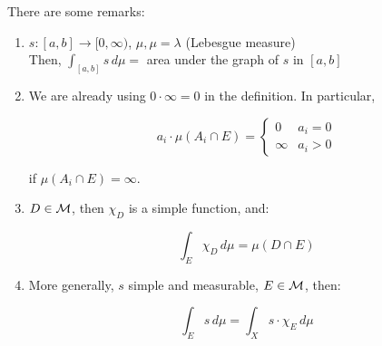 \begin{fremark}
    There are some remarks:
    \vspace{1em}

    \begin{enumerate}
        \item $s: [a,b] \to [0, \infty)$, $\mu, \mu = \lambda$ (Lebesgue measure)\\
        Then, $\int_{[a,b]} s \, d\mu =$ area under the graph of $s$ in $[a,b]$
        \vspace{1em}

        \item We are already using $0 \cdot \infty = 0$ in the definition. In particular,
        
        $$a_i \cdot \mu(A_i \cap E) = \begin{cases}
            0 & a_i = 0 \\
            \infty & a_i > 0
        \end{cases}
        $$

        if $\mu(A_i \cap E) = \infty$.
        \vspace{1em}

        \item $D \in \mathcal{M}$, then $\chi_D$ is a simple function, and:
        
        $$\int_{E} \chi_D \, d\mu = \mu(D \cap E)$$

        \vspace{1em}

        \item More generally, $s$ simple and measurable, $E \in \mathcal{M}$, then:
        
        $$\int_{E} s \, d\mu = \int_{X} s \cdot \chi_E \, d\mu$$

    \end{enumerate}

\end{fremark}

\vspace{1em}

